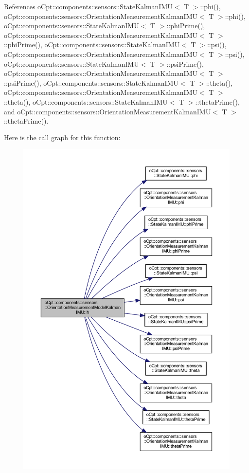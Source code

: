 References o\+Cpt\+::components\+::sensors\+::\+State\+Kalman\+I\+M\+U$<$ T $>$\+::phi(), o\+Cpt\+::components\+::sensors\+::\+Orientation\+Measurement\+Kalman\+I\+M\+U$<$ T $>$\+::phi(), o\+Cpt\+::components\+::sensors\+::\+State\+Kalman\+I\+M\+U$<$ T $>$\+::phi\+Prime(), o\+Cpt\+::components\+::sensors\+::\+Orientation\+Measurement\+Kalman\+I\+M\+U$<$ T $>$\+::phi\+Prime(), o\+Cpt\+::components\+::sensors\+::\+State\+Kalman\+I\+M\+U$<$ T $>$\+::psi(), o\+Cpt\+::components\+::sensors\+::\+Orientation\+Measurement\+Kalman\+I\+M\+U$<$ T $>$\+::psi(), o\+Cpt\+::components\+::sensors\+::\+State\+Kalman\+I\+M\+U$<$ T $>$\+::psi\+Prime(), o\+Cpt\+::components\+::sensors\+::\+Orientation\+Measurement\+Kalman\+I\+M\+U$<$ T $>$\+::psi\+Prime(), o\+Cpt\+::components\+::sensors\+::\+State\+Kalman\+I\+M\+U$<$ T $>$\+::theta(), o\+Cpt\+::components\+::sensors\+::\+Orientation\+Measurement\+Kalman\+I\+M\+U$<$ T $>$\+::theta(), o\+Cpt\+::components\+::sensors\+::\+State\+Kalman\+I\+M\+U$<$ T $>$\+::theta\+Prime(), and o\+Cpt\+::components\+::sensors\+::\+Orientation\+Measurement\+Kalman\+I\+M\+U$<$ T $>$\+::theta\+Prime().

Here is the call graph for this function\+:
\nopagebreak
\begin{figure}[H]
\begin{center}
\leavevmode
\includegraphics[width=350pt]{classo_cpt_1_1components_1_1sensors_1_1_orientation_measurement_model_kalman_i_m_u_a8d3bb87295520e0d4b5f02975fa420f0_cgraph}
\end{center}
\end{figure}


